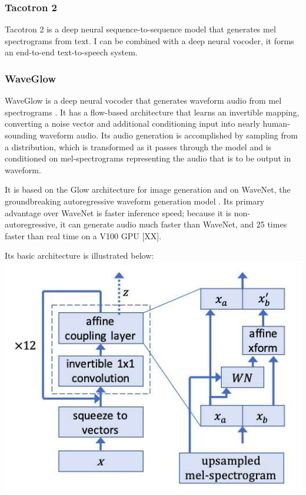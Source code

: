 \subsubsection{Tacotron 2}
Tacotron 2 is a deep neural sequence-to-sequence model that generates mel spectrograms from text. 
I can be combined with a deep neural vocoder, it forms an end-to-end text-to-speech system.
\subsubsection{WaveGlow}
%
WaveGlow is a deep neural vocoder that generates waveform audio from mel spectrograms \citep{waveglow}. It has a 
flow-based architecture that learns an invertible mapping, converting a noise vector and 
additional conditioning input into nearly human-sounding waveform audio. Its audio generation 
is accomplished by sampling from a distribution, which is transformed as it passes through the model 
and is conditioned on mel-spectrograms representing the audio that is to be output in waveform.

It is based on the Glow architecture for image generation \citep{glow} and on WaveNet, the groundbreaking 
autoregressive waveform generation model \citep{wavenet}. Its primary advantage over WaveNet is faster inference speed;
because it is non-autoregressive, it can generate audio much faster than WaveNet, and 25 times faster 
than real time on a V100 GPU [XX].

Its basic architecture is illustrated below:\\
\includegraphics[width=15cm]{img/img_waveglow.jpg}

